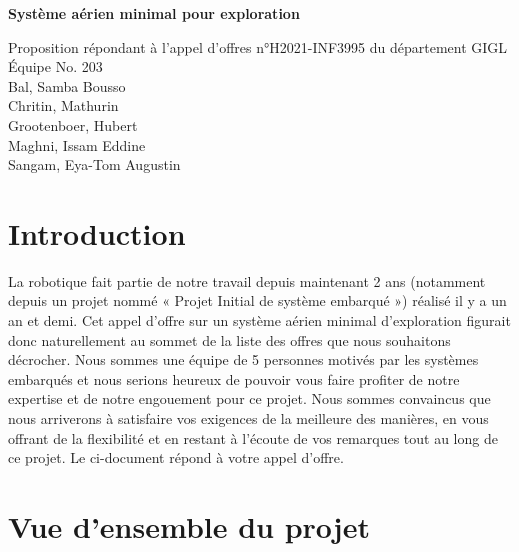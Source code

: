 \documentclass{mistcoursedoc}
\author{Équipe \equipe}
\newcommand{\equipe}{203}
\begin{document}
\maketitle
\vspace{2cm}
\begin{center}

  {\Huge\bf Système aérien minimal pour exploration\\[3em]}

  \Large Proposition répondant à l’appel d’offres  n°H2021-INF3995 du département GIGL\\[3em]


  Équipe No. \equipe\\[3em]

  Bal, Samba Bousso\\[1em]
  Chritin, Mathurin\\[1em]
  Grootenboer, Hubert\\[1em]
  Maghni, Issam Eddine\\[1em]
  Sangam, Eya-Tom Augustin\\[1em]

  \vfill

\end{center}

\newpage
{
  \renewcommand{\contentsname}{Table des matières}
  \hypersetup{hidelinks}
  \setcounter{secnumdepth}{3}
  \setcounter{tocdepth}{3}
  \tableofcontents
}
\newpage

\section*{Introduction}
La robotique fait partie de notre travail depuis maintenant 2 ans (notamment depuis un projet nommé « Projet Initial de système embarqué ») réalisé il y a un an et demi. Cet appel d'offre sur un système aérien minimal d'exploration figurait donc naturellement au sommet de la liste des offres que nous souhaitons décrocher. Nous sommes une équipe de 5 personnes motivés par les systèmes embarqués et nous serions heureux de pouvoir vous faire profiter de notre expertise et de notre engouement pour ce projet. Nous sommes convaincus que nous arriverons à satisfaire vos exigences de la meilleure des manières, en vous offrant de la flexibilité et en restant à l'écoute de vos remarques tout au long de ce projet. Le ci-document répond à votre appel d’offre.

\section{Vue d’ensemble du projet}
\end{document}
